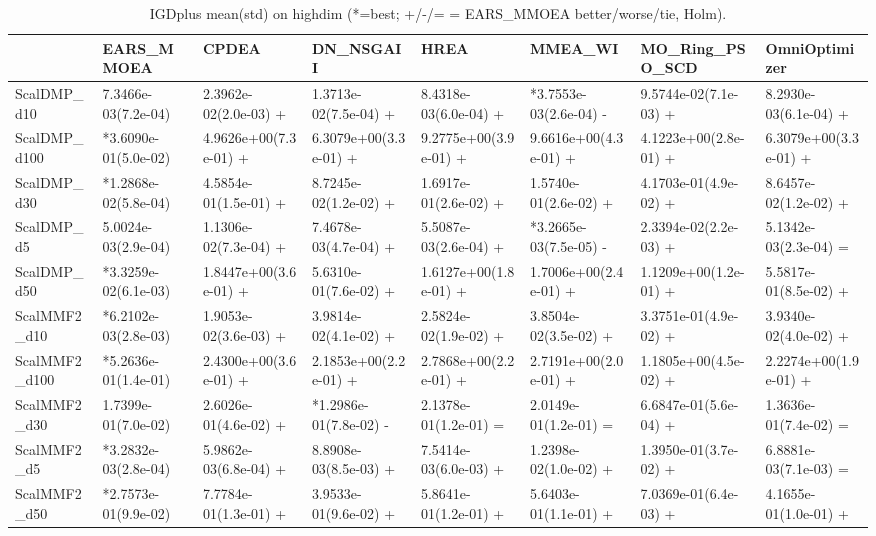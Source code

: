\begin{table}[t]
\centering
\caption{IGDplus mean(std) on highdim (*=best; +/-/= = EARS_MMOEA better/worse/tie, Holm).}
\label{tab:highdim_IGDplus}
\begin{tabular}{llllllll}
\toprule
 & EARS\_MMOEA & CPDEA & DN\_NSGAII & HREA & MMEA\_WI & MO\_Ring\_PSO\_SCD & OmniOptimizer \\
\midrule
ScalDMP\_d10 & 7.3466e-03(7.2e-04) & 2.3962e-02(2.0e-03) + & 1.3713e-02(7.5e-04) + & 8.4318e-03(6.0e-04) + & *3.7553e-03(2.6e-04) - & 9.5744e-02(7.1e-03) + & 8.2930e-03(6.1e-04) + \\
ScalDMP\_d100 & *3.6090e-01(5.0e-02) & 4.9626e+00(7.3e-01) + & 6.3079e+00(3.3e-01) + & 9.2775e+00(3.9e-01) + & 9.6616e+00(4.3e-01) + & 4.1223e+00(2.8e-01) + & 6.3079e+00(3.3e-01) + \\
ScalDMP\_d30 & *1.2868e-02(5.8e-04) & 4.5854e-01(1.5e-01) + & 8.7245e-02(1.2e-02) + & 1.6917e-01(2.6e-02) + & 1.5740e-01(2.6e-02) + & 4.1703e-01(4.9e-02) + & 8.6457e-02(1.2e-02) + \\
ScalDMP\_d5 & 5.0024e-03(2.9e-04) & 1.1306e-02(7.3e-04) + & 7.4678e-03(4.7e-04) + & 5.5087e-03(2.6e-04) + & *3.2665e-03(7.5e-05) - & 2.3394e-02(2.2e-03) + & 5.1342e-03(2.3e-04) = \\
ScalDMP\_d50 & *3.3259e-02(6.1e-03) & 1.8447e+00(3.6e-01) + & 5.6310e-01(7.6e-02) + & 1.6127e+00(1.8e-01) + & 1.7006e+00(2.4e-01) + & 1.1209e+00(1.2e-01) + & 5.5817e-01(8.5e-02) + \\
ScalMMF2\_d10 & *6.2102e-03(2.8e-03) & 1.9053e-02(3.6e-03) + & 3.9814e-02(4.1e-02) + & 2.5824e-02(1.9e-02) + & 3.8504e-02(3.5e-02) + & 3.3751e-01(4.9e-02) + & 3.9340e-02(4.0e-02) + \\
ScalMMF2\_d100 & *5.2636e-01(1.4e-01) & 2.4300e+00(3.6e-01) + & 2.1853e+00(2.2e-01) + & 2.7868e+00(2.2e-01) + & 2.7191e+00(2.0e-01) + & 1.1805e+00(4.5e-02) + & 2.2274e+00(1.9e-01) + \\
ScalMMF2\_d30 & 1.7399e-01(7.0e-02) & 2.6026e-01(4.6e-02) + & *1.2986e-01(7.8e-02) - & 2.1378e-01(1.2e-01) = & 2.0149e-01(1.2e-01) = & 6.6847e-01(5.6e-04) + & 1.3636e-01(7.4e-02) = \\
ScalMMF2\_d5 & *3.2832e-03(2.8e-04) & 5.9862e-03(6.8e-04) + & 8.8908e-03(8.5e-03) + & 7.5414e-03(6.0e-03) + & 1.2398e-02(1.0e-02) + & 1.3950e-01(3.7e-02) + & 6.8881e-03(7.1e-03) = \\
ScalMMF2\_d50 & *2.7573e-01(9.9e-02) & 7.7784e-01(1.3e-01) + & 3.9533e-01(9.6e-02) + & 5.8641e-01(1.2e-01) + & 5.6403e-01(1.1e-01) + & 7.0369e-01(6.4e-03) + & 4.1655e-01(1.0e-01) + \\
\bottomrule
\end{tabular}
\end{table}
